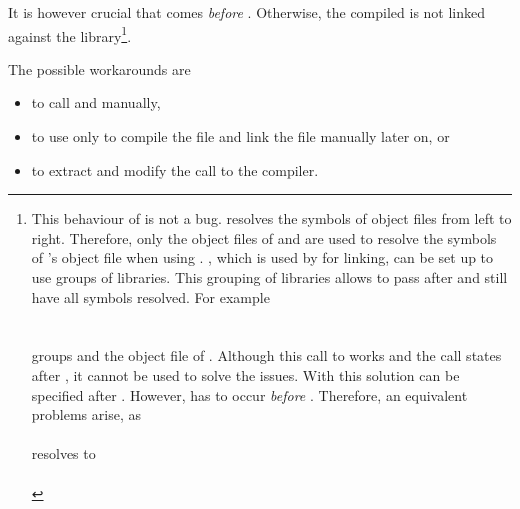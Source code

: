 It is however crucial that  comes \emph{before} . Otherwise, the compiled  is not linked against the \LibCharSet library\footnote{This behaviour of \Gcc is not a bug. \Gcc resolves the symbols of object files from left to right. Therefore, only the object files of  and  are used to resolve the symbols of 's object file when using \Mcc. \Ld, which is used by \Gcc for linking, can be set up to use groups of libraries. This grouping of libraries allows to pass  after  and still have all symbols resolved. For example\\
\\
\hspace{2cm}\\
groups \LibCharSet and the object file of . Although this call to \Gcc works and the call states  after , it cannot be used to solve the \Mcc issues. With this solution  can be specified after . However,  has to occur \emph{before} . Therefore, an equivalent problems arise, as\\
\\
$\quad$\hspace{2cm}\\
resolves to\\
\\
\hspace{2cm}}.

The possible workarounds are
\begin{itemize}
\item to call \Mprep and \Gcc manually,
\item to use \Mcc only to compile the file and link the file manually later on, or
\item to extract and modify the call to the \C compiler.
\end{itemize}

